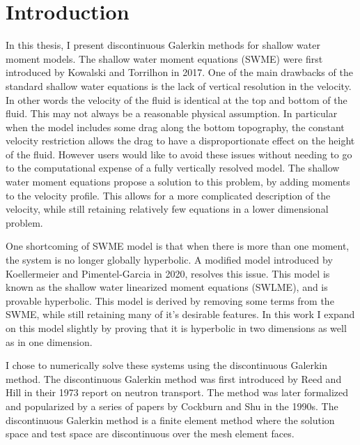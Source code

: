 \chapter{Introduction}

In this thesis, I present discontinuous Galerkin methods for shallow water moment
models.
The shallow water moment equations (SWME) were first introduced by Kowalski and
Torrilhon\cite{kowalski2017moment} in 2017.
One of the main drawbacks of the standard shallow water equations is the lack of
vertical resolution in the velocity.
In other words the velocity of the fluid is identical at the top and bottom of the
fluid.
This may not always be a reasonable physical assumption.
In particular when the model includes some drag along the bottom topography, the
constant velocity restriction allows the drag to have a disproportionate effect on the
height of the fluid.
However users would like to avoid these issues without needing to go to the
computational expense of a fully vertically resolved model.
The shallow water moment equations propose a solution to this problem, by adding
moments to the velocity profile.
This allows for a more complicated description of the velocity, while still retaining
relatively few equations in a lower dimensional problem.

One shortcoming of SWME model is that when there is more than one moment, the system
is no longer globally hyperbolic.
A modified model introduced by Koellermeier and
Pimentel-Garcia\cite{koellermeier2020steady} in 2020, resolves this issue.
This model is known as the shallow water linearized moment equations (SWLME), and
is provable hyperbolic.
This model is derived by removing some terms from the SWME, while still retaining
many of it's desirable features.
In this work I expand on this model slightly by proving that it is hyperbolic in
two dimensions as well as in one dimension.

I chose to numerically solve these systems using the discontinuous Galerkin method.
The discontinuous Galerkin method was first introduced by Reed and
Hill\cite{techreport:Reed1973} in their 1973 report on neutron transport.
The method was later formalized and popularized by a series of papers by Cockburn and
Shu\cite{article:Cockburn1989II,article:Cockburn1991I,article:Cockburn1989III,article:Cockburn1990IV,article:Cockburn1998V}
in the 1990s.
The discontinuous Galerkin method is a finite element method where the solution space
and test space are discontinuous over the mesh element faces.

